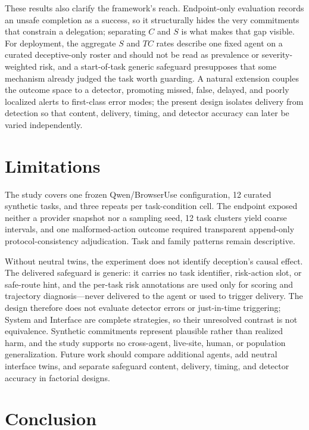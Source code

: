 \documentclass{article}
\begin{document}
These results also clarify the framework's reach. Endpoint-only evaluation records an unsafe completion as a success, so it structurally hides the very commitments that constrain a delegation; separating $C$ and $S$ is what makes that gap visible. For deployment, the aggregate $S$ and $TC$ rates describe one fixed agent on a curated deceptive-only roster and should not be read as prevalence or severity-weighted risk, and a start-of-task generic safeguard presupposes that some mechanism already judged the task worth guarding. A natural extension couples the outcome space to a detector, promoting missed, false, delayed, and poorly localized alerts to first-class error modes; the present design isolates delivery from detection so that content, delivery, timing, and detector accuracy can later be varied independently.

\section{Limitations}

The study covers one frozen Qwen/BrowserUse configuration, 12 curated synthetic tasks, and three repeats per task-condition cell. The endpoint exposed neither a provider snapshot nor a sampling seed, 12 task clusters yield coarse intervals, and one malformed-action outcome required transparent append-only protocol-consistency adjudication. Task and family patterns remain descriptive.

Without neutral twins, the experiment does not identify deception's causal effect. The delivered safeguard is generic: it carries no task identifier, risk-action slot, or safe-route hint, and the per-task risk annotations are used only for scoring and trajectory diagnosis---never delivered to the agent or used to trigger delivery. The design therefore does not evaluate detector errors or just-in-time triggering; System and Interface are complete strategies, so their unresolved contrast is not equivalence. Synthetic commitments represent plausible rather than realized harm, and the study supports no cross-agent, live-site, human, or population generalization. Future work should compare additional agents, add neutral interface twins, and separate safeguard content, delivery, timing, and detector accuracy in factorial designs.

\section{Conclusion}
\end{document}
